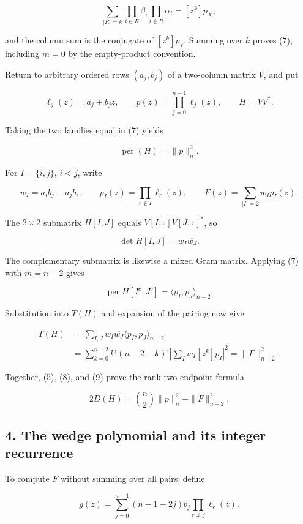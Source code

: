 \documentclass[10pt,a4paper]{article}
\begin{document}
\nopagebreak[4]
\[
\sum_{|R|=k}\prod_{i\in R}\beta_i\prod_{i\notin R}\alpha_i
=[z^k]p_X,
\]

and the column sum is the conjugate of \([z^k]p_Y\). Summing over \(k\)
proves (7), including \(m=0\) by the empty-product convention.

Return to arbitrary ordered rows \((a_j,b_j)\) of a two-column matrix
\(V\), and put

\nopagebreak[4]
\[
\ell_j(z)=a_j+b_jz,\qquad
p(z)=\prod_{j=0}^{n-1}\ell_j(z),\qquad H=VV^*.
\]

Taking the two families equal in (7) yields

\nopagebreak[4]
\[
\operatorname{per}(H)=\|p\|_n^2.
\tag{8}
\]

For \(I=\{i,j\}\), \(i<j\), write

\nopagebreak[4]
\[
w_I=a_i b_j-a_j b_i,\qquad
p_I(z)=\prod_{r\notin I}\ell_r(z),\qquad
F(z)=\sum_{|I|=2}w_I p_I(z).
\]

The \(2\times2\) submatrix \(H[I,J]\) equals \(V[I,:]V[J,:]^*\), so

\nopagebreak[4]
\[
\det H[I,J]=w_I\overline{w_J}.
\]

The complementary submatrix is likewise a mixed Gram matrix. Applying
(7) with \(m=n-2\) gives

\nopagebreak[4]
\[
\operatorname{per}H[I^c,J^c]=\langle p_I,p_J\rangle_{n-2}.
\]

Substitution into \(T(H)\) and expansion of the pairing now give

\nopagebreak[4]
\[
\begin{aligned}
T(H)
&=\sum_{I,J}w_I\overline{w_J}\langle p_I,p_J\rangle_{n-2}\\
&=\sum_{k=0}^{n-2}k!(n-2-k)!
        \left|\sum_I w_I[z^k]p_I\right|^2
=\|F\|_{n-2}^2.
\end{aligned}
\tag{9}
\]

Together, (5), (8), and (9) prove the rank-two endpoint formula

\nopagebreak[4]
\[
2D(H)=\binom n2\|p\|_n^2-\|F\|_{n-2}^2.
\tag{10}
\]

\subsection{4. The wedge polynomial and its integer
recurrence}\label{the-wedge-polynomial-and-its-integer-recurrence}

To compute \(F\) without summing over all pairs, define

\nopagebreak[4]
\[
g(z)=\sum_{j=0}^{n-1}(n-1-2j)b_j
                         \prod_{r\ne j}\ell_r(z).
\]
\end{document}
